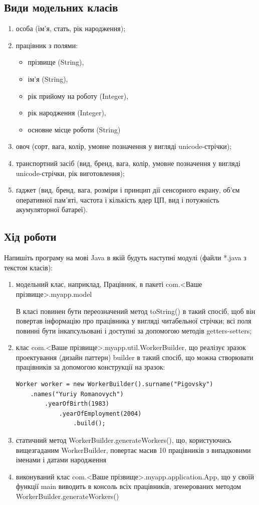 \subsection{Види модельних класів}
\begin{enumerate}
\item особа (ім’я, стать, рік народження);
\item працівник з полями:
	\begin{itemize}
	\item прізвище (String),
	\item ім’я (String),
	\item рік прийому на роботу (Integer),
	\item рік народження (Integer),
	\item основне місце роботи (String)
	\end{itemize}
\item овоч (сорт, вага, колір, умовне позначення у вигляді unicode-стрічки);
\item транспортний засіб (вид, бренд, вага, колір, умовне позначення у вигляді unicode-стрічки, рік виготовлення);
\item ґаджет (вид, бренд, вага, розміри і принцип дії сенсорного екрану, об’єм оперативної пам’яті, частота і кількість ядер ЦП, вид і потужність акумуляторної батареї).
\end{enumerate}

\subsection{Хід роботи}
Напишіть програму на мові Java в якій будуть наступні модулі (файли *.java з текстом класів):
\begin{enumerate}
\item модельний клас, наприклад, Працівник, в пакеті com.<Ваше прізвище>.myapp.model

В класі повинен бути переозначений метод toString() в такий спосіб, щоб він повертав інформацію про працівника у вигляді читабельної стрічки; всі поля повинні бути інкапсульовані і доступні за допомогою методів getters-setters;
\item  клас com.<Ваше прізвище>.myapp.util.WorkerBuilder, що реалізує зразок проектування (дизайн паттерн) builder в такий спосіб, що можна створювати працівників за допомогою конструкції на зразок:
\begin{lstlisting}
Worker worker = new WorkerBuilder().surname("Pigovsky")
    .names("Yuriy Romanovych")
        .yearOfBirth(1983)
            .yearOfEmployment(2004)
                .build();
\end{lstlisting}
\item статичний метод WorkerBuilder.generateWorkers(), що, користуючись вищезгаданим WorkerBuilder, повертає масив 10 працівників з випадковими іменами і датами народження 
\item виконуваний клас com.<Ваше прізвище>.myapp.application.App, що у своїй функції main виводить в консоль всіх працівників, згенерованих методом WorkerBuilder.generateWorkers()
\end{enumerate}

